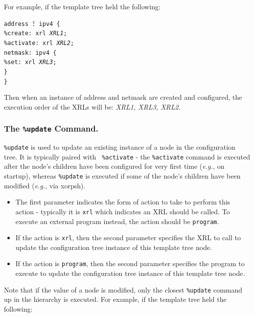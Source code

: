 \documentclass[11pt]{article}
\newcommand{\eg}{\emph{e.g.,}\xspace}
\begin{document}
For example, if the template tree held the following:

\begin{tabbing}
\tt addr\=\tt ess \=\tt@: ipv4 \{\\
    \>\tt\%create: xrl {\it XRL1};\\
    \>\tt\%activate: xrl {\it XRL2};\\
    \>\tt netmask: ipv4 \{\\
        \>\>\tt\%set: xrl {\it XRL3};\\
    \>\tt\}\\
\tt\}
\end{tabbing}

Then when an instance of address and netmask are created and
configured, the execution order of the XRLs will be: {\it XRL1, XRL3, XRL2}.

\subsubsection{The {\tt \%update} Command.}

{\tt \%update} is used to update an existing instance of a
node in the configuration tree.  It is typically paired with {\tt
\%activate} - the {\tt \%activate} command is executed
after the node's children have been configured for very first time (\eg on
startup), whereas {\tt \%update} is executed if some of the node's children
have been modified (\eg via xorpsh).

\begin{itemize}

  \item The first parameter indicates the form of action to take to perform
  this action - typically it is {\tt xrl} which indicates an XRL should
  be called.
  To execute an external program instead, the action should be {\tt program}.

  \item If the action is {\tt xrl}, then the second parameter specifies the
  XRL to call to update the configuration tree instance of this template tree
  node.

  \item If the action is {\tt program}, then the second parameter specifies
  the program to execute to update the configuration tree instance of this
  template tree node.

\end{itemize}

Note that if the value of a node is modified, only the closest {\tt \%update}
command up in the hierarchy is executed. For example, if the template tree
held the following:
\end{document}
